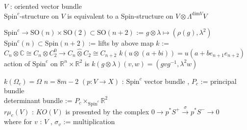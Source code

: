 \begin{Theorem}
\itemprop
  \For \(V\) : oriented vector bundle \\
  \Then \(\text{Spin}^c\)-structure on \(V\) is equivalent to a \(\text{Spin}\)-structure on \(V \otimes \Lambda^{\text{dim}V} V\)
\end{Theorem}

\begin{Definition}
\itemdefi
  \Define \(\text{Spin}^c \to \text{SO}(n) \times \text{SO}(2) \subset \text{SO}(n+2)\) := \(g \otimes \lambda \mapsto (\rho(g) , \lambda^2)\)
\itemdefi
  \Define \(\text{Spin}^c(n) \subset \text{Spin}(n+2)\) := lifts by above map
\itemdefi
  \Define \(k\) := \(C_n \otimes \mathbb{C} \cong C_n \otimes C_2^0 \to C_n \hat{\otimes} C_2 \cong C_{n+2}\)
\itemprop
  \Then \(k(u \otimes (a + bi)) = u(a + b e_{n+1} e_{n+2})\) \\
  \Then action of \(\text{Spin}^c\) on \(\mathbb{R}^{n} \times \mathbb{R}^2\) is \(k(g \otimes \lambda)(v,w) = (g v g^{-1} , \lambda^2 w)\)
\end{Definition}

\begin{Theorem}
\itemprop
  \(k(\Omega_c) = \Omega\)
\itemwhen
  \(n = 8 m - 2\)
\itemprop
  \For \((p : V \to X)\) : \(\text{Spin}^c\) vector bundle , \(P_c\) := principal bundle \\
  \Define determinant bundle := \(P_c \times_{\text{Spin}^c} \mathbb{R}^2\) \\
\itemprop
  \Then \(r \mu_c(V)\) : \(KO(V)\) is presented by the complex \(0 \to p^* {S^+} \overset{\sigma}{\to} p^*{S^-} \to 0\) \\ where for \(v\) : \(V\) , \(\sigma_v\) := multiplication
\end{Theorem}